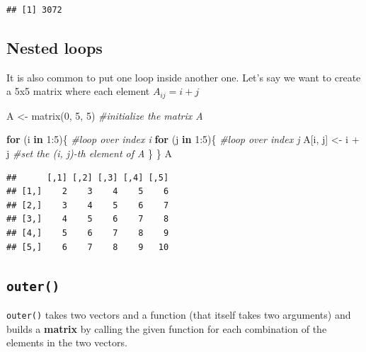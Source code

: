 \documentclass[
]{book}
\newenvironment{Shaded}{\begin{snugshade}}{\end{snugshade}}
\newcommand{\CommentTok}[1]{\textcolor[rgb]{0.56,0.35,0.01}{\textit{#1}}}
\newcommand{\ControlFlowTok}[1]{\textcolor[rgb]{0.13,0.29,0.53}{\textbf{#1}}}
\newcommand{\DecValTok}[1]{\textcolor[rgb]{0.00,0.00,0.81}{#1}}
\newcommand{\FunctionTok}[1]{\textcolor[rgb]{0.00,0.00,0.00}{#1}}
\newcommand{\NormalTok}[1]{#1}
\newcommand{\OtherTok}[1]{\textcolor[rgb]{0.56,0.35,0.01}{#1}}
\newcommand{\SpecialCharTok}[1]{\textcolor[rgb]{0.00,0.00,0.00}{#1}}
\begin{document}
\begin{verbatim}
## [1] 3072
\end{verbatim}

\hypertarget{nested-loops}{%
\subsection{Nested loops}\label{nested-loops}}

It is also common to put one loop inside another one. Let's say we want to create a 5x5 matrix where each element \(A_{i j}=i+j\)

\begin{Shaded}
\begin{Highlighting}[]
\NormalTok{A }\OtherTok{\textless{}{-}} \FunctionTok{matrix}\NormalTok{(}\DecValTok{0}\NormalTok{, }\DecValTok{5}\NormalTok{, }\DecValTok{5}\NormalTok{) }\CommentTok{\#initialize the matrix A}

\ControlFlowTok{for}\NormalTok{ (i }\ControlFlowTok{in} \DecValTok{1}\SpecialCharTok{:}\DecValTok{5}\NormalTok{)\{      }\CommentTok{\#loop over index i}
  \ControlFlowTok{for}\NormalTok{ (j }\ControlFlowTok{in} \DecValTok{1}\SpecialCharTok{:}\DecValTok{5}\NormalTok{)\{    }\CommentTok{\#loop over index j}
\NormalTok{    A[i, j] }\OtherTok{\textless{}{-}}\NormalTok{ i }\SpecialCharTok{+}\NormalTok{ j }\CommentTok{\#set the (i, j){-}th element of A}
\NormalTok{  \}}
\NormalTok{\}  }
\NormalTok{A}
\end{Highlighting}
\end{Shaded}

\begin{verbatim}
##      [,1] [,2] [,3] [,4] [,5]
## [1,]    2    3    4    5    6
## [2,]    3    4    5    6    7
## [3,]    4    5    6    7    8
## [4,]    5    6    7    8    9
## [5,]    6    7    8    9   10
\end{verbatim}

\hypertarget{outer}{%
\subsection{\texorpdfstring{\texttt{outer()}}{outer()}}\label{outer}}

\texttt{outer()} takes two vectors and a function (that itself takes two arguments) and builds a \textbf{matrix} by calling the given function for each combination of the elements in the two vectors.
\end{document}
